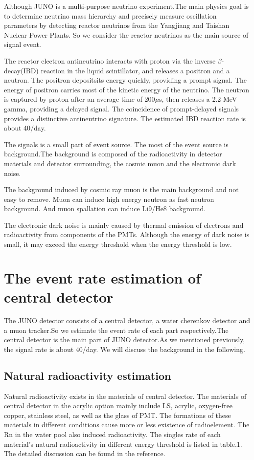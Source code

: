 \documentclass[a4paper,10pt,twoside]{paper}
\begin{document}
\begin{multicols}{2}
		Although JUNO is a multi-purpose neutrino experiment.The main 
		physics
		goal is to determine neutrino mass hierarchy and precisely
		measure oscillation parameters by detecting reactor neutrinos 
		from the Yangjiang and Taishan Nuclear Power Plants. So we 
		consider the reactor neutrinos as the main source of signal event.

		
		The reactor electron antineutrino interacts with proton via 
		the inverse $\beta$-decay(IBD) reaction in the liquid 
		scintillator, and releases a positron and a neutron. 
		The positron depositsits energy quickly, providing a prompt 
		signal. The energy of positron carries most of the kinetic 
		energy of the neutrino.
		The neutron is captured by proton after an average time of 
		200$\mu$s, then releases a 2.2 MeV gamma, providing a delayed 
		signal. The coincidence of prompt-delayed signals provides a 
		distinctive antineutrino signature. The estimated IBD reaction 
		rate is about 40/day\cite{lab2}. 
		
		The signals is a small part of event source. The most of
		the event source is background.The background is composed of
		the radioactivity in detector materials and detector 
		surrounding, the cosmic muon and the electronic dark noise.

		The background induced by cosmic ray muon is the main background
		and not easy to remove. Muon can induce high energy neutron as
		fast neutron background. And muon spallation can induce Li9/He8
		background.

		The electronic dark noise is mainly caused by thermal 
		emission of electrons and radioactivity from components of the 
		PMTs. Although the energy of dark noise is small, it may exceed
		the energy threshold when the energy threshold is low.


		\section{The event rate estimation of central detector}
		The JUNO detector consists of a central detector, a water 
		cherenkov detector and a muon tracker.So we estimate the event
		rate of each part respectively.The central detector is the 
		main part of JUNO detector.As we mentioned previously, 
		the signal
		rate is about 40/day. We will discuss the background in the 
		following.

		\subsection{Natural radioactivity estimation}
		Natural radioactivity exists in the materials of central 
		detector.
		The materials of central detector in the acrylic option mainly
		include LS, acrylic, oxygen-free copper, stainless steel, as
		well as the glass of PMT.
		The formations of these materials in different conditions 
		cause more or less existence of radioelement.
		The Rn in the water pool also induced radioactivity.
		The singles rate of each material's natural radioactivity 
		in different energy threshold is 
		listed in table.1. The detailed discussion can be found in
		the reference\cite{lab3}.

	\end{multicols}
\end{document}

